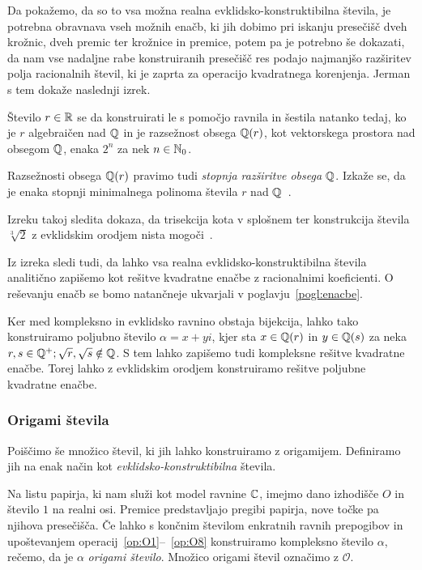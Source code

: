 Da pokažemo, da so to vsa možna realna evklidsko-konstruktibilna števila, je potrebna obravnava vseh možnih enačb, ki jih dobimo pri iskanju presečišč dveh krožnic, dveh premic ter krožnice in premice, potem pa je potrebno še dokazati, da nam vse nadaljne rabe konstruiranih presečišč res podajo najmanjšo razširitev polja racionalnih števil, ki je zaprta za operacijo kvadratnega korenjenja. Jerman s tem dokaže naslednji izrek.

\begin{izrek}
    \label{izr:evkl_konstr}
    Število $r \in \mathbb R$ se da konstruirati le s pomočjo ravnila in šestila natanko tedaj, ko je $r$ algebraičen nad $\mathbb Q$ in je razsežnost obsega $\mathbb Q(r)$, kot vektorskega prostora nad obsegom $\mathbb Q$, enaka $2^n$ za nek $n \in \mathbb N_0$.
\end{izrek}

\begin{opomba}
    \label{op:razseznost_obsega_evkl}
    Razsežnosti obsega $\mathbb Q(r)$ pravimo tudi \emph{stopnja razširitve obsega $\mathbb Q$}. Izkaže se, da je enaka stopnji minimalnega polinoma števila $r$ nad $\mathbb Q$~\cite[str.\ 77]{jerman1998}.
\end{opomba}

Izreku takoj sledita dokaza, da trisekcija kota v splošnem ter konstrukcija števila $ \sqrt[3]{2} $ z evklidskim orodjem nista mogoči~\cite[str.\ 77--78]{jerman1998}.

Iz izreka sledi tudi, da lahko vsa realna evklidsko-konstruktibilna števila analitično zapišemo kot rešitve kvadratne enačbe z racionalnimi koeficienti. O reševanju enačb se bomo natančneje ukvarjali v poglavju~\ref{pogl:enacbe}.

Ker med kompleksno in evklidsko ravnino obstaja bijekcija, lahko tako konstruiramo poljubno število $\alpha = x + y i$, kjer sta $x \in \mathbb Q(r)$ in $y \in \mathbb Q(s)$ za neka $r, s \in \mathbb Q^+; \sqrt{r}, \sqrt{s} \notin \mathbb Q$. S tem lahko zapišemo tudi kompleksne rešitve kvadratne enačbe. Torej lahko z evklidskim orodjem konstruiramo rešitve poljubne kvadratne enačbe.

\subsubsection{Origami števila}
\label{origami_konstruktibilnost}

Poiščimo še množico števil, ki jih lahko konstruiramo z origamijem. Definiramo jih na enak način kot \emph{evklidsko-konstruktibilna} števila.

\begin{definicija}
    \label{def:origami_stevilo}
    Na listu papirja, ki nam služi kot model ravnine $\mathbb C$, imejmo dano izhodišče $O$ in število $1$ na realni osi. Premice predstavljajo pregibi papirja, nove točke pa njihova presečišča. Če lahko s končnim številom enkratnih ravnih prepogibov in upoštevanjem operacij~\ref{op:O1}--~\ref{op:O8} konstruiramo kompleksno število $\alpha$, rečemo, da je $\alpha$ \emph{origami število}. Množico origami števil označimo z $\mathcal{O}$.
\end{definicija}

